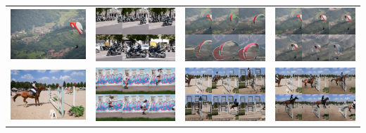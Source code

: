 \begin{table}[t]
\begin{tabular}{c|c|c|c}
        \includegraphics[width=0.23\linewidth]{media/glider/ii.jpg} & \includegraphics[width=0.23\linewidth]{media/glider/dv.png} & \includegraphics[width=0.23\linewidth]{media/glider/vc.png} & \includegraphics[width=0.23\linewidth]{media/glider/ours.png} \\
        \includegraphics[width=0.23\linewidth]{media/horse/ii.jpg}  & \includegraphics[width=0.23\linewidth]{media/horse/dv.png}  & \includegraphics[width=0.23\linewidth]{media/horse/vc.png}  & \includegraphics[width=0.23\linewidth]{media/horse/ours.png}  \\

\end{tabular}
\end{table}
